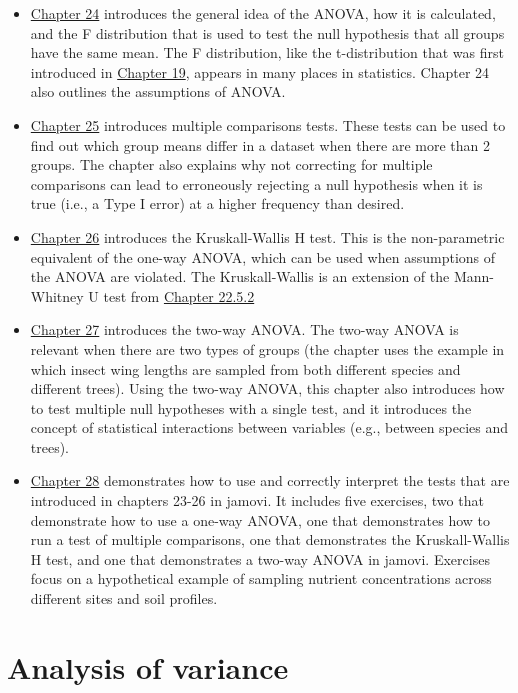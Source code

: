 \documentclass[
  openany]{scrbook}
\begin{document}
\begin{itemize}
\item
  \protect\hyperlink{Chapter_24}{Chapter 24} introduces the general idea of the ANOVA, how it is calculated, and the F distribution that is used to test the null hypothesis that all groups have the same mean.
  The F distribution, like the t-distribution that was first introduced in \protect\hyperlink{Chapter_19}{Chapter 19}, appears in many places in statistics.
  Chapter 24 also outlines the assumptions of ANOVA.
\item
  \protect\hyperlink{Chapter_25}{Chapter 25} introduces multiple comparisons tests.
  These tests can be used to find out which group means differ in a dataset when there are more than 2 groups.
  The chapter also explains why not correcting for multiple comparisons can lead to erroneously rejecting a null hypothesis when it is true (i.e., a Type I error) at a higher frequency than desired.
\item
  \protect\hyperlink{Chapter_26}{Chapter 26} introduces the Kruskall-Wallis H test.
  This is the non-parametric equivalent of the one-way ANOVA, which can be used when assumptions of the ANOVA are violated.
  The Kruskall-Wallis is an extension of the Mann-Whitney U test from \protect\hyperlink{mann-whitney-u-test}{Chapter 22.5.2}
\item
  \protect\hyperlink{Chapter_27}{Chapter 27} introduces the two-way ANOVA.
  The two-way ANOVA is relevant when there are two types of groups (the chapter uses the example in which insect wing lengths are sampled from both different species and different trees).
  Using the two-way ANOVA, this chapter also introduces how to test multiple null hypotheses with a single test, and it introduces the concept of statistical interactions between variables (e.g., between species and trees).
\item
  \protect\hyperlink{Chapter_28}{Chapter 28} demonstrates how to use and correctly interpret the tests that are introduced in chapters 23-26 in jamovi.
  It includes five exercises, two that demonstrate how to use a one-way ANOVA, one that demonstrates how to run a test of multiple comparisons, one that demonstrates the Kruskall-Wallis H test, and one that demonstrates a two-way ANOVA in jamovi.
  Exercises focus on a hypothetical example of sampling nutrient concentrations across different sites and soil profiles.
\end{itemize}

\hypertarget{Chapter_24}{%
\chapter{Analysis of variance}\label{Chapter_24}}
\end{document}
